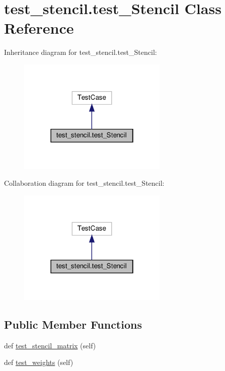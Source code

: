 \hypertarget{classtest__stencil_1_1test__Stencil}{}\section{test\+\_\+stencil.\+test\+\_\+\+Stencil Class Reference}
\label{classtest__stencil_1_1test__Stencil}


Inheritance diagram for test\+\_\+stencil.\+test\+\_\+\+Stencil\+:
\nopagebreak
\begin{figure}[H]
\begin{center}
\leavevmode
\includegraphics[width=202pt]{classtest__stencil_1_1test__Stencil__inherit__graph}
\end{center}
\end{figure}


Collaboration diagram for test\+\_\+stencil.\+test\+\_\+\+Stencil\+:
\nopagebreak
\begin{figure}[H]
\begin{center}
\leavevmode
\includegraphics[width=202pt]{classtest__stencil_1_1test__Stencil__coll__graph}
\end{center}
\end{figure}
\subsection*{Public Member Functions}
\begin{DoxyCompactItemize}
\item 
def \hyperlink{classtest__stencil_1_1test__Stencil_a9f77e568b5ace9bb494e3a5725305d9c}{test\+\_\+stencil\+\_\+matrix} (self)
\item 
def \hyperlink{classtest__stencil_1_1test__Stencil_af1151663d21ad230396accaa1904c62c}{test\+\_\+weights} (self)
\end{DoxyCompactItemize}


